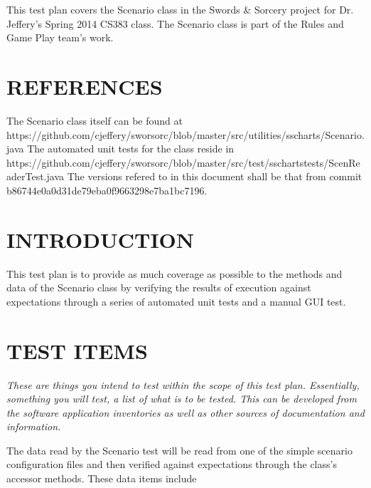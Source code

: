 {\color{black}
This test plan covers the Scenario class in the Swords \& Sorcery project for 
Dr. Jeffery's Spring 2014 CS383 class. The Scenario class is part of the Rules 
and Game Play team's work.}


\section[REFERENCES]{\bfseries\color{black}
REFERENCES}

{\color{black}
The Scenario class itself can be found at https://github.com/cjeffery/sworsorc/blob/master/src/utilities/sscharts/Scenario.java 
The automated unit tests for the class reside in https://github.com/cjeffery/sworsorc/blob/master/src/test/sschartstests/ScenReaderTest.java 
The versions refered to in this document shall be that from commit  b86744e0a0d31de79eba0f9663298e7ba1bc7196.
}



\section[INTRODUCTION]{\bfseries\color{black} INTRODUCTION}

{\color{black}

This test plan is to provide as much coverage as possible to the methods 
and data of the Scenario class by verifying the results of execution 
against expectations through a series of automated unit tests and a 
manual GUI test.

}

\section[TEST ITEMS]{\bfseries\color{black} TEST ITEMS}

{\itshape\color{black}
These are things you intend to test within the scope of this test
plan. Essentially, something you will test, a list of what is to be
tested. This can be developed from the software application
inventories as well as other sources of documentation and information.
}

{\color{black}
The data read by the Scenario test will be read from one of the simple 
scenario configuration files and then verified against expectations through 
the class's accessor methods. These data items include }

